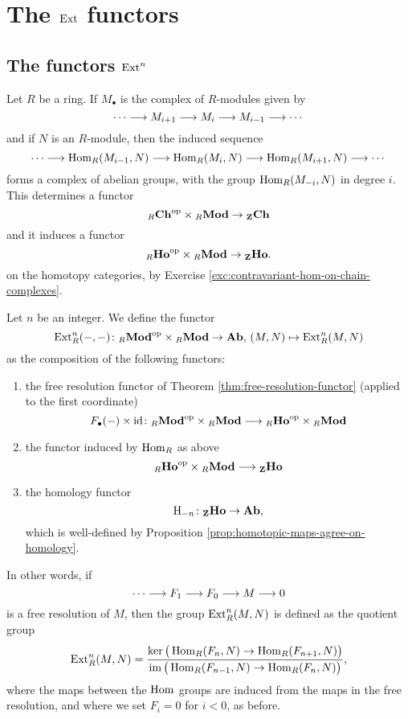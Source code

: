 
\chapter{The $\operatorname{Ext}$ functors}

\section{The functors $\operatorname{Ext}^n$}

Let $R$ be a ring. If $M_\bullet$ is the complex of $R$-modules given by
\[
	\cdots \longrightarrow M_{i+1} \longrightarrow   M_i \longrightarrow M_{i-1} \longrightarrow \cdots
\]
and if $N$ is an $R$-module, then the induced sequence 
\[
	\cdots \longrightarrow \operatorname{Hom}_R(M_{i-1}, N) \longrightarrow
	\operatorname{Hom}_R(M_i, N) \longrightarrow \operatorname{Hom}_R(M_{i+1}, N) \longrightarrow \cdots
\]
forms a complex of abelian groups, with the group $\operatorname{Hom}_R(M_{-i},N)$ in degree $i$. This determines a functor
\[
	{}_R\mathbf{Ch}^{\mathrm{op}} \times {}_R\mathbf{Mod} \to {}_{\mathbf{Z}} \mathbf{Ch}
\]
and  it induces a functor 
\[
	{}_R\mathbf{Ho}^{\mathrm{op}}  \times {}_R\mathbf{Mod} \to {}_{\mathbf{Z}} \mathbf{Ho}.
\]
on the homotopy categories,  by Exercise \ref{exc:contravariant-hom-on-chain-complexes}.


\begin{definition}
Let $n$ be an integer. We define the functor
\[
	\operatorname{Ext}^n_R(-,-) \colon {}_R\mathbf{Mod}^{\mathrm{op}} \times {}_R\mathbf{Mod} \to \mathbf{Ab},\,
	(M,N) \mapsto \operatorname{Ext}^n_R(M,N)
\]
as the composition of the following functors:
\begin{enumerate}
\item the free resolution functor of Theorem \ref{thm:free-resolution-functor} (applied to the first coordinate)
\[
	F_\bullet(-) \times {\rm id} \colon {}_R\mathbf{Mod}^{\mathrm{op}} \times {}_R\mathbf{Mod} \longrightarrow {}_R \mathbf{Ho}^{\mathrm{op}} \times {}_R\mathbf{Mod}
\]
\item the functor induced by $\operatorname{Hom}_R$ as above
\[
	 {}_R \mathbf{Ho}^{\mathrm{op}} \times {}_R\mathbf{Mod} \longrightarrow {}_{\mathbf{Z}} \mathbf{Ho}
\]
\item the homology functor
\[
	{\mathrm H}_{-n} \colon  {}_{\mathbf{Z}} \mathbf{Ho} \to \mathbf{Ab},
\]
which is well-defined by Proposition \ref{prop:homotopic-maps-agree-on-homology}.
\end{enumerate}
\end{definition}

In other words, if
\[
	\cdots \longrightarrow F_1 \longrightarrow F_0 \longrightarrow M \longrightarrow 0
\]
is a free resolution of $M$, then the group $\operatorname{Ext}^n_R(M,N)$ is defined as
the quotient group
\[
	\operatorname{Ext}^n_R(M,N) = 
	\frac{ \ker \big( \operatorname{Hom}_R(F_n,N) \to \operatorname{Hom}_R(F_{n+1},N) \big)}
	{\operatorname{im} \big( \operatorname{Hom}_R(F_{n-1},N) \to \operatorname{Hom}_R(F_{n},N) \big)},
\]
where the maps between the $\operatorname{Hom}$ groups are induced from the maps in the free resolution, and where we set $F_i=0$ for $i<0$, as before.


